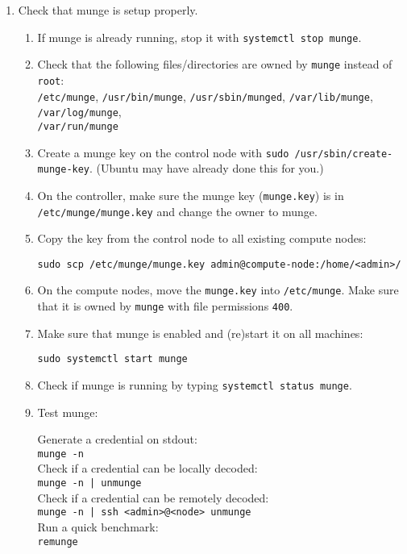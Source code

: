 \begin{enumerate}
\item Check that munge is setup properly. \label{list:munge}
	\begin{enumerate}
	\item If munge is already running, stop it with \texttt{systemctl stop munge}.

	\item Check that the following files/directories are owned by \texttt{munge} instead of \texttt{root}: \\
	\texttt{/etc/munge}, 
	\texttt{/usr/bin/munge}, 
	\texttt{/usr/sbin/munged}, 
	\texttt{/var/lib/munge}, 
	\texttt{/var/log/munge}, \\
	\texttt{/var/run/munge}

	\item Create a munge key on the control node with \texttt{sudo /usr/sbin/create-munge-key}. (Ubuntu may have already done this for you.) 

	\item On the controller, make sure the munge key (\texttt{munge.key}) is in \texttt{/etc/munge/munge.key} and change the owner to munge.  

	\item Copy the key from the control node to all existing compute nodes: 

		\texttt{sudo scp /etc/munge/munge.key admin@compute-node:/home/<admin>/}

	\item On the compute nodes, move the \texttt{munge.key} into \texttt{/etc/munge}. Make sure that it is owned by \texttt{munge} with file permissions \texttt{400}.

	\item Make sure that munge is enabled and (re)start it on all machines:

		\texttt{sudo systemctl start munge}

	\item Check if munge is running by typing \texttt{systemctl status munge}.

	\item Test munge: 

	    Generate a credential on stdout: \\
	    \texttt{munge -n} \\
	    Check if a credential can be locally decoded: \\
	    \texttt{munge -n | unmunge} \\
	    Check if a credential can be remotely decoded: \\
	    \texttt{munge -n | ssh <admin>@<node> unmunge} \\
	    Run a quick benchmark: \\
	    \texttt{remunge}


\end{enumerate}
\end{enumerate}

